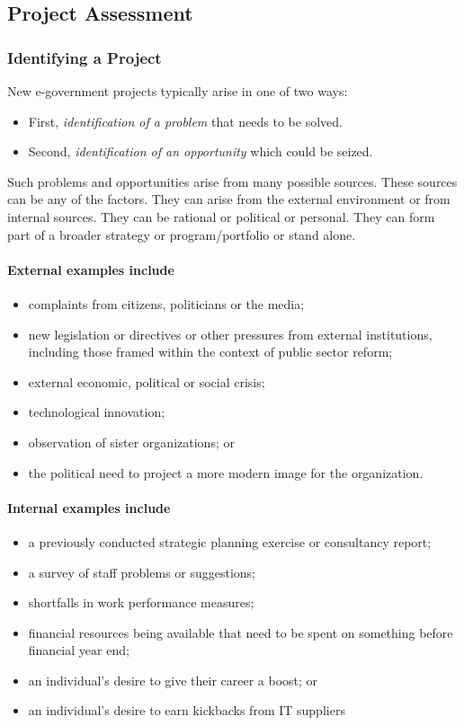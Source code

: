 \subsection{Project Assessment}
\subsubsection{Identifying a Project}
New e-government projects typically arise in one of two ways:
\begin{itemize}
    \item First, \textit{identification of a  problem} that needs to be solved.
    \item Second, \textit{identification of an opportunity} which could be seized.
\end{itemize}

Such problems and opportunities arise from many possible sources. These sources can be any of the factors. They can arise from the external environment or from internal sources. They can be
rational or political or personal. They can form part of a broader strategy or program/portfolio or stand alone.

\paragraph*{External examples include}
\begin{itemize}
	\item complaints from citizens, politicians or
	the media;
\item new legislation or directives or other
	pressures from external institutions,
	including those framed within the context of public sector reform;
\item external economic, political or social crisis;
\item technological innovation;
\item observation of sister organizations; or
\item the political need to project a more
	modern image for the organization.
\end{itemize}

\paragraph*{Internal examples include}

\begin{itemize}
	\item a previously conducted strategic planning exercise or consultancy report;
	\item a survey of staff problems or suggestions;
	\item shortfalls in work performance measures;
	\item financial resources being available that
	need to be spent on something before
	financial year end;
	\item an individual’s desire to give their career
	a boost; or
	\item an individual’s desire to earn kickbacks
	from IT suppliers
\end{itemize}

